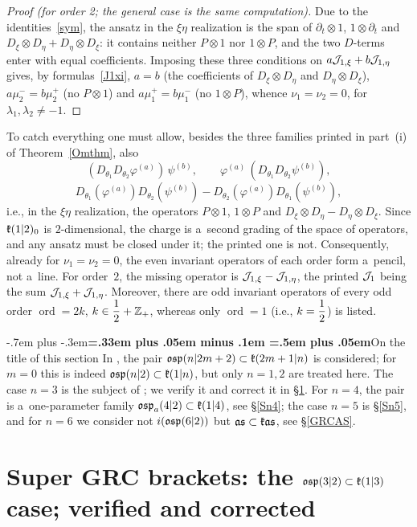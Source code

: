 \documentclass[12pt,a4paper]{amsart}
\makeatletter
\providecommand{\headspaces}{\spaceskip=.33em plus .05em minus .1em \xspaceskip=.5em plus .05em}
\def\subsection{\@startsection{subsection}{2}{0pt}{-1ex \@plus -.4ex \@minus -.2ex}%
  {-.7em plus -.3em}{\normalfont\normalsize\bfseries\boldmath\headspaces}}
\theoremstyle{thm}
\theoremstyle{definition}
\let\ssec\subsection
\newcommand {\Dx}{D_\xi}
\newcommand {\De}{D_\eta}
\newcommand {\tp}{\otimes}
\newcommand {\Nord}{\operatorname{ord}}   %
\makeatother
\begin{document}
\begin{proof}[Proof \textup{(for order 2; the general case is the same computation)}]
Due to the identities~\eqref{sym}, the ansatz in the $\xi\eta$ realization is the span of
$\partial_t\tp1$, $1\tp\partial_t$ and $\Dx\tp\De+\De\tp\Dx$: it contains neither
$P\tp1$ nor $1\tp P$, and the two $D$-terms enter with equal coefficients. Imposing these
three conditions on $a{\mathcal J}_{1,\xi}+b{\mathcal J}_{1,\eta}$ gives, by formulas~\eqref{J1xi},
$a=b$ (the coefficients of $\Dx\tp\De$ and $\De\tp\Dx$), $a\mu_2^-=b\mu_2^+$ (no $P\tp1$) and
$a\mu_1^+=b\mu_1^-$ (no $1\tp P$), whence $\nu_1=\nu_2=0$, for $\lambda_1,\lambda_2\neq-1$. \end{proof}

 To catch everything one must allow, besides
the three families printed in part~(i) of Theorem~\ref{Omthm}, also
\[
(D_{\theta_1}D_{\theta_2}\varphi^{(a)})\,\psi^{(b)},\qquad
\varphi^{(a)}\,(D_{\theta_1}D_{\theta_2}\psi^{(b)}),
\]
\[
D_{\theta_1}(\varphi^{(a)})D_{\theta_2}(\psi^{(b)})
-D_{\theta_2}(\varphi^{(a)})D_{\theta_1}(\psi^{(b)}),
\]
i.e., in the $\xi\eta$ realization, the operators $P\tp1$, $1\tp P$ and
$\Dx\tp\De-\De\tp\Dx$. Since ${\mathfrak{k}}(1|2)_0$ is $2$-dimensional, the charge is a~second grading
of the space of operators, and any ansatz must be closed under it; the printed one is not.
Consequently, already for $\nu_1=\nu_2=0$, the even invariant operators of each order form
a~pencil, not a~line. For order~$2$, the missing operator is ${\mathcal J}_{1,\xi}-{\mathcal J}_{1,\eta}$, the
printed ${\mathcal J}_1$ being the sum ${\mathcal J}_{1,\xi}+{\mathcal J}_{1,\eta}$. Moreover, there are odd invariant
operators of every odd order $\Nord=2k$, $k\in\nfrac12+\Zee_+$, whereas only $\Nord=1$ (i.e., $k=\nfrac12$) is listed.

\ssec{On the title of this section} In \cite[(4)]{BLS1}, the pair
${\mathfrak{osp}}(n|2m+2)\subset{\mathfrak{k}}(2m+1|n)$ is considered; for $m=0$ this is indeed ${\mathfrak{osp}}(n|2)\subset{\mathfrak{k}}(1|n)$, but
only $n=1,2$ are treated here. The case $n=3$ is the subject of \cite{BLO}; we verify it and
correct it in \S\ref{Sblo}. For $n=4$, the pair is %
a~one-parameter family ${\mathfrak{osp}}_a(4|2)\subset{\mathfrak{k}}(1|4)$, see \S\ref{Sn4}; the case $n=5$ is
\S\ref{Sn5}, and for $n=6$ we consider not $i({\mathfrak{osp}}(6|2))$ but ${\mathfrak{as}}\subset{\mathfrak{k}}{\mathfrak{as}}$, see
\S\ref{GRCAS}.

\section{Super GRC brackets: the ${\mathfrak{osp}}(3|2)\subset{\mathfrak{k}}(1|3)$ case;
\cite{BLO} verified and corrected}\label{Sblo}
\end{document}
